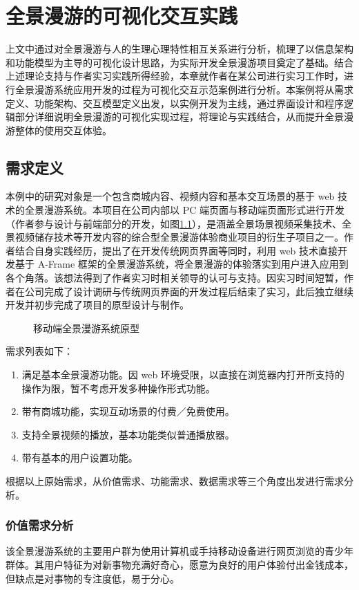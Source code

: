 \chapter{全景漫游的可视化交互实践}
上文中通过对全景漫游与人的生理心理特性相互关系进行分析，梳理了以信息架构和功能模型为主导的可视化设计思路，为实际开发全景漫游项目奠定了基础。结合上述理论支持与作者实习实践所得经验，本章就作者在某公司进行实习工作时，进行全景漫游系统应用开发的过程为可视化交互示范案例进行分析。本案例将从需求定义、功能架构、交互模型定义出发，以实例开发为主线，通过界面设计和程序逻辑部分详细说明全景漫游的可视化实现过程，将理论与实践结合，从而提升全景漫游整体的使用交互体验。

\section{需求定义}
本例中的研究对象是一个包含商城内容、视频内容和基本交互场景的基于 web 技术的全景漫游系统。本项目在公司内部以 PC 端页面与移动端页面形式进行开发（作者参与设计与前端部分的开发，如图\ref{fig:woniu}），是涵盖全景场景视频采集技术、全景视频储存技术等开发内容的综合型全景漫游体验商业项目的衍生子项目之一。作者结合自身实践经历，提出了在开发传统网页界面等同时，利用 web 技术直接开发基于 A-Frame 框架的全景漫游系统，将全景漫游的体验落实到用户进入应用到各个角落。该想法得到了作者实习时相关领导的认可与支持。因实习时间短暂，作者在公司完成了设计调研与传统网页界面的开发过程后结束了实习，此后独立继续开发并初步完成了项目的原型设计与制作。

\begin{figure}[htp]
\centering
{}
\caption{移动端全景漫游系统原型}
\label{fig:woniu}
\end{figure}

需求列表如下：
\begin{enumerate}
	\item 满足基本全景漫游功能。因 web 环境受限，以直接在浏览器内打开所支持的操作为限，暂不考虑开发多种操作形式功能。
	\item 带有商城功能，实现互动场景的付费／免费使用。
	\item 支持全景视频的播放，基本功能类似普通播放器。
	\item 带有基本的用户设置功能。
\end{enumerate}

根据以上原始需求，从价值需求、功能需求、数据需求等三个角度出发进行需求分析。

\subsection{价值需求分析}
该全景漫游系统的主要用户群为使用计算机或手持移动设备进行网页浏览的青少年群体。其用户特征为对新事物充满好奇心，愿意为良好的用户体验付出金钱成本，但缺点是对事物的专注度低，易于分心。

